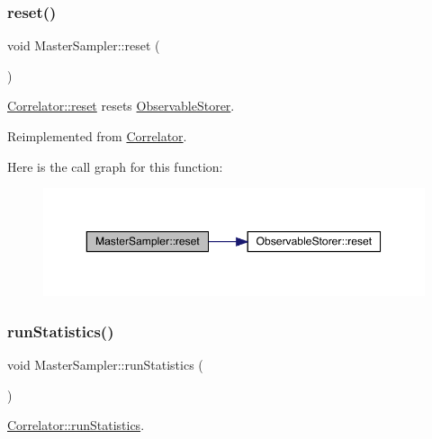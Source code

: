 \subsubsection{\texorpdfstring{reset()}{reset()}}
{\footnotesize\ttfamily void Master\+Sampler\+::reset (\begin{DoxyParamCaption}{ }\end{DoxyParamCaption})\hspace{0.3cm}{\ttfamily [virtual]}}



\mbox{\hyperlink{class_correlator_aacca40262d2cd62f0a3964e832f948c1}{Correlator\+::reset}} resets \mbox{\hyperlink{class_observable_storer}{Observable\+Storer}}. 



Reimplemented from \mbox{\hyperlink{class_correlator_aacca40262d2cd62f0a3964e832f948c1}{Correlator}}.

Here is the call graph for this function\+:\nopagebreak
\begin{figure}[H]
\begin{center}
\leavevmode
\includegraphics[width=350pt]{class_master_sampler_a275a032513db03c899056fd07d71cc89_cgraph}
\end{center}
\end{figure}
\mbox{\label{class_master_sampler_ab7913d0dbdea57af3f469a3cdd74f8fc}} 
\subsubsection{\texorpdfstring{runStatistics()}{runStatistics()}}
{\footnotesize\ttfamily void Master\+Sampler\+::run\+Statistics (\begin{DoxyParamCaption}{ }\end{DoxyParamCaption})\hspace{0.3cm}{\ttfamily [virtual]}}



\mbox{\hyperlink{class_correlator_a35197b1d12b62ef30b79c0138a26456e}{Correlator\+::run\+Statistics}}. 

